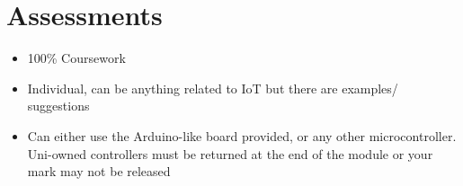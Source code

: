 
\section*{Assessments}

\begin{itemize}
  \item 100\% Coursework
  \item Individual, can be anything related to IoT but there are examples/ suggestions
  \item Can either use the Arduino-like board provided, or any other microcontroller. Uni-owned controllers must be returned at the end of the module or your mark may not be released
\end{itemize}
